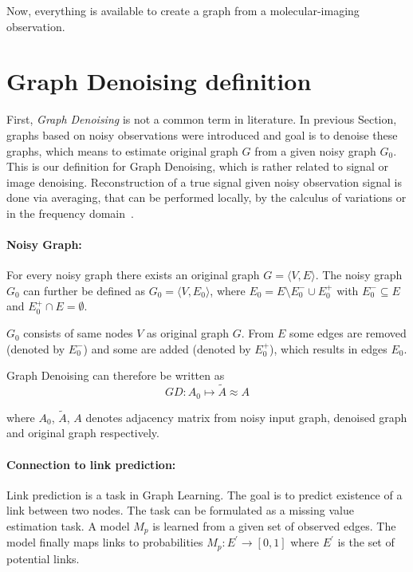 Now, everything is available to create a graph from a molecular-imaging observation.


\section{Graph Denoising definition}

First, \textit{Graph Denoising} is not a common term in literature.
In previous Section, graphs based on noisy observations were introduced and goal is to denoise these graphs,
which means to estimate original graph $G$ from a given noisy graph $G_0$. 
This is our definition for Graph Denoising, which is rather related to signal or image denoising.
Reconstruction of a true signal given noisy observation signal is done via averaging, that can be performed
locally, by the calculus of variations or in the frequency domain~\cite{noneLocalMean}. 

\paragraph{Noisy Graph:}
For every noisy graph there exists an original graph $G = \langle V,E \rangle$.
The noisy graph $G_0$ can further be defined as $G_0 = \langle V, E_0 \rangle$,  
 where $E_0 = E \setminus  E^{-}_0 \cup  E^{+}_0$ with $E^{-}_0 \subseteq E$ and $E^{+}_0 \cap E = \emptyset$.

$G_0$ consists of same nodes $V$ as original graph $G$. 
From $E$ some edges are removed (denoted by $E^{-}_0$) and some are added
(denoted by $E^{+}_0$), which results in edges $E_0$.

Graph Denoising can therefore be written as 
\begin{equation}
    GD: A_0 \mapsto \tilde{A} \approx A
\end{equation}

where $A_0$, $\tilde{A}$, $A$ denotes adjacency matrix from noisy input graph, denoised graph and original graph respectively.


\paragraph{Connection to link prediction:}
Link prediction is a task in Graph Learning. 
The goal is to predict existence of a link between two nodes.
The task can be formulated as a missing value estimation task. A model $M_p$ is learned
from a given set of observed edges. The model finally maps links to probabilities
$M_p : E^{\prime} \rightarrow [0,1]$ where $E^{\prime}$ is the set of potential links.


